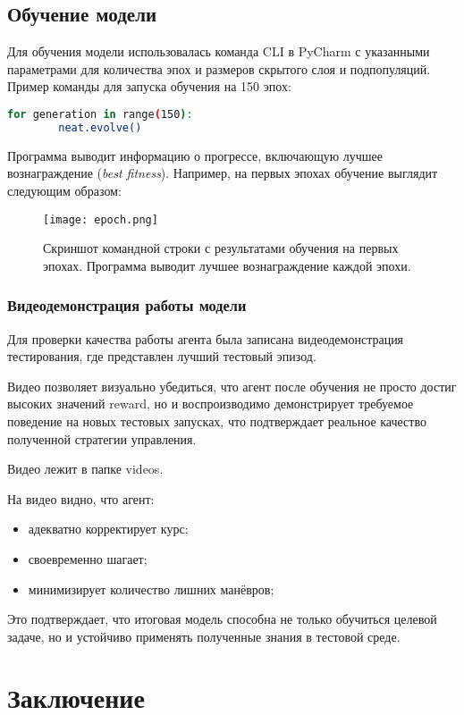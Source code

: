 \documentclass[a4paper,12pt]{article}
\begin{document}
\subsection{Обучение модели}

Для обучения модели использовалась команда CLI в PyCharm с указанными параметрами для количества эпох и размеров скрытого слоя и подпопуляций. Пример команды для запуска обучения на 150 эпох:
\begin{lstlisting}[language=bash]
	for generation in range(150):  
        neat.evolve()
\end{lstlisting}
Программа выводит информацию о прогрессе, включающую лучшее вознаграждение (\textit{best fitness}). Например, на первых эпохах обучение выглядит следующим образом:

\begin{figure}[H]
	\centering
	\texttt{[image: epoch.png]}
	\caption{Скриншот командной строки с результатами обучения на первых эпохах. Программа выводит лучшее вознаграждение каждой эпохи.}
	\label{fig:training_screenshot}
\end{figure}
\subsubsection{Видеодемонстрация работы модели}

Для  проверки качества работы агента была записана видеодемонстрация тестирования, где представлен лучший тестовый эпизод.

Видео позволяет визуально убедиться, что агент после обучения не просто достиг высоких значений reward, но и воспроизводимо демонстрирует требуемое поведение на новых тестовых запусках, что подтверждает реальное качество полученной стратегии управления.

Видео лежит в  папке videos.

На видео видно, что агент:
\begin{itemize}
	\item адекватно корректирует курс;
	\item своевременно шагает;
	\item минимизирует количество лишних манёвров;
\end{itemize}

Это подтверждает, что итоговая модель способна не только обучиться целевой задаче, но и устойчиво применять полученные знания в тестовой среде.
\newpage
\section{Заключение}
\end{document}

